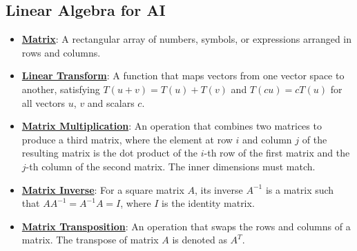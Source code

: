 \documentclass{article}%
\begin{document}
\subsection{Linear Algebra for AI}%
\label{subsec:LinearAlgebraforAI}%
\begin{itemize}[leftmargin=*]%
\item \href{https://purdue.brightspace.com/d2l/common/assets/pdfjs-d2l-dist/1.0.14-legacy/web/viewer.html?file=%2Fcontent%2Fenforced%2F1095467-wl.202510.CS.24300.001%2F04L1-Linear Algebra Primer.pdf%3Fou%3D1095467&lang=en-us&container=d2l-fileviewer-rendered-pdf&fullscreen=d2l-fileviewer-rendered-pdf-dialog&height=667#page=4}{\textbf{Matrix}}: A rectangular array of numbers, symbols, or expressions arranged in rows and columns.%
\item \href{https://purdue.brightspace.com/d2l/common/assets/pdfjs-d2l-dist/1.0.14-legacy/web/viewer.html?file=%2Fcontent%2Fenforced%2F1095467-wl.202510.CS.24300.001%2F04L1-Linear Algebra Primer.pdf%3Fou%3D1095467&lang=en-us&container=d2l-fileviewer-rendered-pdf&fullscreen=d2l-fileviewer-rendered-pdf-dialog&height=667#page=5}{\textbf{Linear Transform}}: A function that maps vectors from one vector space to another, satisfying $T(u + v) = T(u) + T(v)$ and $T(cu) = cT(u)$ for all vectors $u$, $v$ and scalars $c$.%
\item \href{https://purdue.brightspace.com/d2l/common/assets/pdfjs-d2l-dist/1.0.14-legacy/web/viewer.html?file=%2Fcontent%2Fenforced%2F1095467-wl.202510.CS.24300.001%2F04L1-Linear Algebra Primer.pdf%3Fou%3D1095467&lang=en-us&container=d2l-fileviewer-rendered-pdf&fullscreen=d2l-fileviewer-rendered-pdf-dialog&height=667#page=14}{\textbf{Matrix Multiplication}}: An operation that combines two matrices to produce a third matrix, where the element at row $i$ and column $j$ of the resulting matrix is the dot product of the $i$-th row of the first matrix and the $j$-th column of the second matrix. The inner dimensions must match.%
\item \href{https://purdue.brightspace.com/d2l/common/assets/pdfjs-d2l-dist/1.0.14-legacy/web/viewer.html?file=%2Fcontent%2Fenforced%2F1095467-wl.202510.CS.24300.001%2F04L1-Linear Algebra Primer.pdf%3Fou%3D1095467&lang=en-us&container=d2l-fileviewer-rendered-pdf&fullscreen=d2l-fileviewer-rendered-pdf-dialog&height=667#page=10}{\textbf{Matrix Inverse}}: For a square matrix $A$, its inverse $A^{-1}$ is a matrix such that $AA^{-1} = A^{-1}A = I$, where $I$ is the identity matrix.%
\item \href{https://purdue.brightspace.com/d2l/common/assets/pdfjs-d2l-dist/1.0.14-legacy/web/viewer.html?file=%2Fcontent%2Fenforced%2F1095467-wl.202510.CS.24300.001%2F04L1-Linear Algebra Primer.pdf%3Fou%3D1095467&lang=en-us&container=d2l-fileviewer-rendered-pdf&fullscreen=d2l-fileviewer-rendered-pdf-dialog&height=667#page=16}{\textbf{Matrix Transposition}}: An operation that swaps the rows and columns of a matrix. The transpose of matrix $A$ is denoted as $A^T$.%

\end{itemize}
\end{document}
